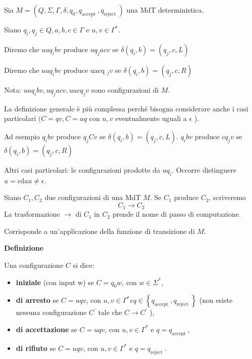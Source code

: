 \vspace{5mm}

Sia $M=\left(Q, \Sigma, \Gamma, \delta, q_{0}, q_{\text {accept }}, q_{\text {reject }}\right)$ una MdT deterministica.

Siano $q_{i}, q_{j} \in Q, a, b, c \in \Gamma$ e $u, v \in \Gamma^{*}$.

Diremo che $u a q_{i} b v$ produce $u q_{j} a c v$
se $\delta\left(q_{i}, b\right)=\left(q_{j}, c, L\right)$

Diremo che $u a q_{i} b v$ produce uacq $_{j} v$
se $\delta\left(q_{i}, b\right)=\left(q_{j}, c, R\right)$

Nota: $uaq_ibv, uq_j a c v, u a c q_{j} v$ sono configurazioni di $M$.

\vspace{5mm}

La definizione generale è più complessa perché bisogna considerare anche i casi particolari $(C=q v, C=u q$ con $u, v$ eventualmente uguali a $\epsilon$ ).

Ad esempio $q_{i} b v$ produce $q_{j} C v$ se $\delta\left(q_{i}, b\right)=\left(q_{j}, c, L\right)$.
$q_{i} b v$ produce $c q_{j} v$ se $\delta\left(q_{i}, b\right)=\left(q_{j}, c, R\right)$

Altri casi particolari: le configurazioni prodotte da $u q_{i}$. Occorre distinguere $u=\epsilon \mathrm{da} u \neq \epsilon$.

\vspace{5mm}

Siano $C_{1}, C_{2}$ due configurazioni di una MdT $M$.
Se $C_{1}$ produce $C_{2}$, scriveremo
$$
C_{1} \rightarrow C_{2}
$$
La trasformazione $\rightarrow$ di $C_{1}$ in $C_{2}$ prende il nome di passo di computazione.

Corrisponde a un'applicazione della funzione di transizione di $M .$

\vspace{5mm}

\textbf{Definizione}

Una configurazione $C$ si dice:
\begin{itemize}
    \item \textbf{iniziale} (con input w) se $C=q_{0} w$, con $w \in \Sigma^{*}$,
    \item \textbf{di arresto} se $C=u q v$, con $u, v \in \Gamma^{*} e q \in\left\{q_{\text {accept }}, q_{\text {reject }}\right\}$ (non esiste nessuna configurazione $C^{\prime}$ tale che $C \rightarrow C^{\prime}$ ),
    \item \textbf{di accettazione} se $C=u q v$, con $u, v \in \Gamma^{*}$ e $q=q_{\text {accept }}$,
    \item \textbf{di rifiuto} se $C=u q v$, con $u, v \in \Gamma^{*}$ e $q=q_{\text {reject }}$.
\end{itemize}

